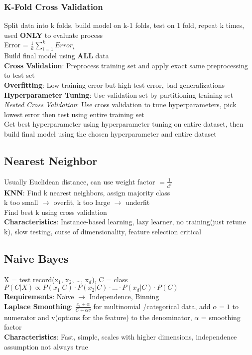 \documentclass{article}
\begin{document}
\begin{multicols*}{2}
        \subsubsection*{K-Fold Cross Validation}
        Split data into k folds, build model on k-1 folds, test on 1 fold, repeat k times, used
        \textbf{ONLY} to evaluate process\\
        Error = $\frac{1}{k} \sum_{i=1}^{k} Error_i$\\
        Build final model using \textbf{ALL} data\\
        \textbf{Cross Validation}: Preprocess training set and apply exact same preprocessing to
        test set\\
        \textbf{Overfitting}: Low training error but high test error, bad generalizations\\
        \textbf{Hyperparameter Tuning}: Use validation set by partitioning training set\\
        \textit{Nested Cross Validation}: Use cross validation to tune hyperparameters, pick
        lowest error then test using entire training set\\
        Get best hyperparameter using hyperparameter tuning on entire dataset, then build final
        model using the chosen hyperparameter and entire dataset\\
        \subsection*{Nearest Neighbor}
        Usually Euclidean distance, can use weight factor $= \frac{1}{d^2}$\\
        \textbf{KNN}: Find k nearest neighbors, assign majority class\\
        k too small $\to$ overfit, k too large $\to$ underfit\\
        Find best k using cross validation\\
        \textbf{Characteristics}: Instance-based learning, lazy learner, no training(just retune
        k), slow testing, curse of dimensionality, feature selection critical\\
        \subsection*{Naive Bayes}
        X = test record(x$_1$, x$_2$, \ldots, x$_d$), C = class\\
        $P(C|X) \propto P(x_1|C) \cdot P(x_2|C) \cdot \ldots \cdot P(x_d|C) \cdot P(C)$\\
        \textbf{Requirements}: Na\"{i}ve $\to$ Independence, Binning\\
        \textbf{Laplace Smoothing}: $\frac{x_i + \alpha}{C + \alpha v}$ for multinomial
        /categorical data, add $\alpha = 1$ to numerator and v(options for the feature) to the
        denominator, $\alpha$ = smoothing factor\\
        \textbf{Characteristics}: Fast, simple, scales with higher dimensions, independence
        assumption not always true\\

\end{multicols*}
\end{document}
